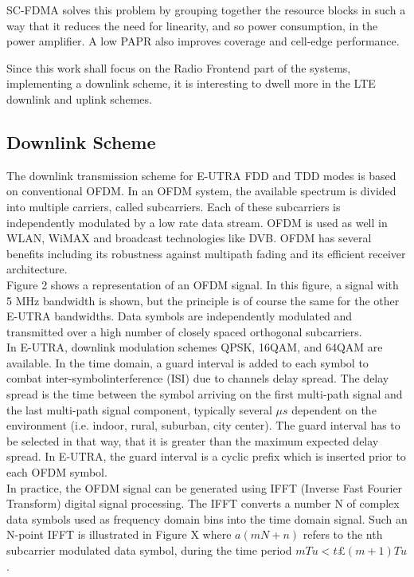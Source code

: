 SC-FDMA solves this problem by grouping together the resource blocks in such a
way that it reduces the need for linearity, and so power consumption, in the
power amplifier. A low PAPR also improves coverage and cell-edge performance.

Since this work shall focus on the Radio Frontend part of the systems, implementing
a downlink scheme, it is interesting to dwell more in the LTE downlink and uplink
schemes.

\subsection{Downlink Scheme}

The downlink transmission scheme for E-UTRA FDD and TDD modes is based on
conventional OFDM. In an OFDM system, the available spectrum is divided into
multiple carriers, called subcarriers. Each of these subcarriers is independently
modulated by a low rate data stream. OFDM is used as well in WLAN, WiMAX and
broadcast technologies like DVB. OFDM has several benefits including its robustness
against multipath fading and its efficient receiver architecture.\\

Figure 2 shows a representation of an OFDM signal. In this figure, a signal with
5 MHz bandwidth is shown, but the principle is of course the same for the other
E-UTRA bandwidths. Data symbols are independently modulated and
transmitted over a high number of closely spaced orthogonal subcarriers.\\

In E-UTRA, downlink modulation schemes QPSK, 16QAM, and 64QAM are available.
In the time domain, a guard interval is added to each symbol to combat
inter-symbolinterference (ISI) due to channels delay spread. The delay spread is
the time between the symbol arriving on the first multi-path signal and the last
multi-path signal component, typically several $\mu s$ dependent on the environment
(i.e. indoor, rural, suburban, city center). The guard interval has to be selected
in that way, that it is greater than the maximum expected delay spread. In E-UTRA,
the guard interval is a cyclic prefix which is inserted prior to each OFDM symbol.\\

In practice, the OFDM signal can be generated using IFFT (Inverse Fast Fourier Transform)
digital signal processing. The IFFT converts a number N of complex data
symbols used as frequency domain bins into the time domain signal. Such an N-point
IFFT is illustrated in Figure X where $a(mN+n)$ refers to the nth subcarrier
modulated data symbol, during the time period $mTu < t £ (m+1)Tu$.

